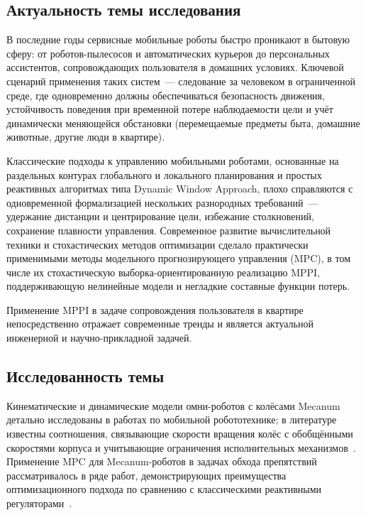 
\subsection*{Актуальность темы исследования}

В последние годы сервисные мобильные роботы быстро проникают в бытовую
сферу: от роботов-пылесосов и автоматических курьеров до персональных
ассистентов, сопровождающих пользователя в домашних условиях. Ключевой
сценарий применения таких систем~--- следование за человеком в
ограниченной среде, где одновременно должны обеспечиваться безопасность
движения, устойчивость поведения при временной потере наблюдаемости
цели и учёт динамически меняющейся обстановки (перемещаемые предметы
быта, домашние животные, другие люди в квартире).

Классические подходы к управлению мобильными роботами, основанные на
раздельных контурах глобального и локального планирования и простых
реактивных алгоритмах типа Dynamic Window Approach, плохо справляются
с одновременной формализацией нескольких разнородных требований~---
удержание дистанции и центрирование цели, избежание столкновений,
сохранение плавности управления. Современное развитие вычислительной
техники и стохастических методов оптимизации сделало практически
применимыми методы модельного прогнозирующего управления (MPC), в том
числе их стохастическую выборка-ориентированную реализацию MPPI,
поддерживающую нелинейные модели и негладкие составные функции потерь.

Применение MPPI в задаче сопровождения пользователя в квартире
непосредственно отражает современные тренды и является актуальной
инженерной и научно-прикладной задачей.

\subsection*{Исследованность темы}

Кинематические и динамические модели омни-роботов с колёсами Mecanum
детально исследованы в работах по мобильной робототехнике; в литературе
известны соотношения, связывающие скорости вращения колёс с
обобщёнными скоростями корпуса и учитывающие ограничения исполнительных
механизмов~\cite{MorenoCaireta2020MPC}. Применение MPC для
Mecanum-роботов в задачах обхода препятствий рассматривалось в ряде
работ, демонстрирующих преимущества оптимизационного подхода по сравнению
с классическими реактивными регуляторами~\cite{MorenoCaireta2020MPC,Alkhaddad2023MPC}.

